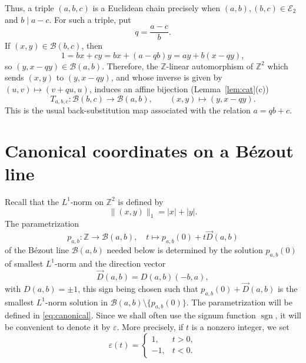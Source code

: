\documentclass[12pt,letterpaper]{article}
\numberwithin{equation}{section}
\newcommand{\Z}{\mathbb Z}
\newcommand{\B}{\mathcal B}
\newcommand{\E}{\mathcal E}
\newcommand{\eps}{\varepsilon}
\newcommand{\normone}[1]{\lVert #1\rVert_1}
\newcommand{\sgn}{\operatorname{sgn}}
\theoremstyle{plain}
\theoremstyle{definition}
\begin{document}
Thus, a triple $(a,b,c)$ is a Euclidean chain precisely when $(a,b),(b,c)\in\E_2$ and $b\mid a-c$. For such a triple, put
\[
 q=\frac{a-c}{b}.
\]
If $(x,y)\in\B(b,c)$, then
\[
  1=bx+cy=bx+(a-qb)y=ay+b(x-qy),
\]
so $(y,x-qy)\in\B(a,b)$. Therefore, the $\Z$-linear automorphism of $\Z^2$ which sends $(x,y)$ to $(y,x-qy)$, and whose inverse is given by $(u,v)\mapsto(v+qu,u)$, induces an affine bijection (Lemma~\ref{lem:cat}(c))
\begin{equation}\label{eq:back-substitution}
 T_{a,b,c}:\B(b,c)\longrightarrow\B(a,b),
 \qquad (x,y)\longmapsto(y,x-qy).
\end{equation}
This is the usual back-substitution map associated with the relation $a=qb+c$.

\section{Canonical coordinates on a Bézout line}

Recall that the $L^1$-norm on $\Z^2$ is defined by
\[
 \normone{(x,y)}=|x|+|y|.
\]
The parametrization 
\[
p_{a,b}:\Z\to\B(a,b),\quad t\mapsto p_{a,b}(0)+t\vec{D}(a,b)
\]
of the Bézout line $\B(a,b)$ needed below is determined by the solution $p_{a,b}(0)$ of smallest $L^1$-norm and the direction vector
\[
 \vec{D}(a,b)=D(a,b)(-b,a),
\]
with $D(a,b)=\pm1$, this sign being chosen such that $p_{a,b}(0)+\vec{D}(a,b)$ is the smallest $L^1$-norm solution in $\B(a,b)\setminus\{p_{a,b}(0)\}$. The parametrization will be defined in \eqref{eq:canonical}. Since we shall often use the signum function $\sgn$, it will be convenient to denote it by $\eps$. More precisely, if $t$ is a nonzero integer, we set 
\begin{equation}\label{eq:eps}
 \eps(t)=
 \begin{cases}
   1,&t>0,\\
   -1,&t<0.
 \end{cases}
\end{equation}
\end{document}
